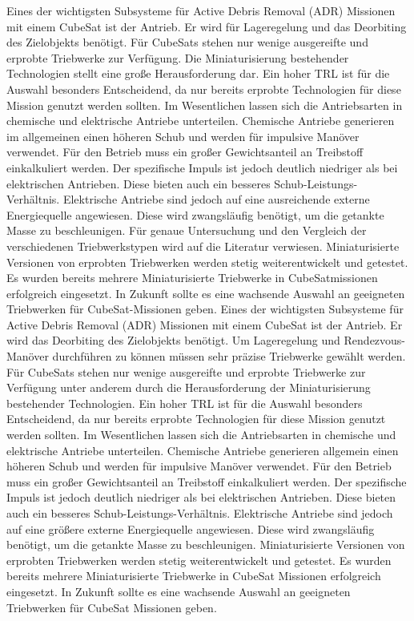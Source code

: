 		Eines der wichtigsten Subsysteme für Active Debris Removal (ADR) Missionen mit einem CubeSat ist der Antrieb. Er wird für Lageregelung und das Deorbiting des Zielobjekts benötigt.
Für CubeSats stehen nur wenige ausgereifte und erprobte Triebwerke zur Verfügung.  Die Miniaturisierung bestehender Technologien stellt eine große Herausforderung dar. Ein hoher TRL ist für die Auswahl besonders Entscheidend, da nur bereits erprobte Technologien für diese Mission genutzt werden sollten.
Im Wesentlichen lassen sich die Antriebsarten in chemische und elektrische Antriebe unterteilen.  Chemische Antriebe generieren im allgemeinen einen höheren Schub und werden für impulsive Manöver verwendet. Für den Betrieb muss ein großer Gewichtsanteil an Treibstoff einkalkuliert werden. Der spezifische Impuls ist jedoch deutlich niedriger als bei elektrischen Antrieben. Diese bieten auch ein besseres Schub-Leistungs-Verhältnis. Elektrische Antriebe sind jedoch auf eine ausreichende externe Energiequelle angewiesen. Diese wird zwangsläufig benötigt, um die getankte Masse zu beschleunigen.
Für genaue Untersuchung und den Vergleich der verschiedenen Triebwerkstypen wird auf die Literatur \cite{Lettau.} verwiesen. Miniaturisierte Versionen von erprobten Triebwerken werden stetig weiterentwickelt und getestet. Es wurden bereits mehrere Miniaturisierte Triebwerke in CubeSatmissionen erfolgreich eingesetzt. In Zukunft sollte es eine wachsende Auswahl an geeigneten Triebwerken für CubeSat-Missionen geben. 
Eines der wichtigsten Subsysteme für Active Debris Removal (ADR) Missionen mit einem CubeSat ist der Antrieb. Er wird das Deorbiting des Zielobjekts benötigt.  Um Lageregelung und Rendezvous-Manöver durchführen zu können müssen sehr präzise Triebwerke gewählt werden. Für CubeSats stehen nur wenige ausgereifte und erprobte Triebwerke zur Verfügung unter anderem durch die Herausforderung der Miniaturisierung bestehender Technologien.  
Ein hoher TRL ist für die Auswahl besonders Entscheidend, da nur bereits erprobte Technologien für diese Mission genutzt werden sollten.
Im Wesentlichen lassen sich die Antriebsarten in chemische und elektrische Antriebe unterteilen.  Chemische Antriebe generieren allgemein einen höheren Schub und werden für impulsive Manöver verwendet. Für den Betrieb muss ein großer Gewichtsanteil an Treibstoff einkalkuliert werden. Der spezifische Impuls ist jedoch deutlich niedriger als bei elektrischen Antrieben. Diese bieten auch ein besseres Schub-Leistungs-Verhältnis. Elektrische Antriebe sind jedoch auf eine größere externe Energiequelle angewiesen. Diese wird zwangsläufig benötigt, um die getankte Masse zu beschleunigen. \cite{Lettau.}
Miniaturisierte Versionen von erprobten Triebwerken werden stetig weiterentwickelt und getestet. Es wurden bereits mehrere Miniaturisierte Triebwerke in CubeSat Missionen erfolgreich eingesetzt. In Zukunft sollte es eine wachsende Auswahl an geeigneten Triebwerken für CubeSat Missionen geben.

